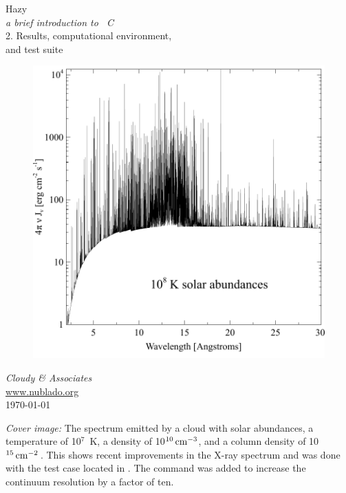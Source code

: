 \documentclass[12pt]{book}
\begin{document}
\frontmatter

\begin{titlepage}
\begin{center}

\Huge
Hazy\\
\Large
\emph{a brief introduction to \Cloudy\ C\VERSION}\\
\LARGE
2. Results, computational environment,\\
and test suite

\begin{figure}
\begin{center}
\includegraphics[clip=on,width=0.8\columnwidth,keepaspectratio]{coll_t7}
\end{center}
\end{figure}

\vspace{15 mm }
\LARGE
\emph{Cloudy \& Associates} \\
\Large
\href{http://www.nublado.org}{www.nublado.org} \\
\normalsize
\today
\end{center}
\end{titlepage}

\clearpage

\vspace{5mm}
\noindent
{\small
{\em Cover image:} The spectrum emitted by a cloud with solar abundances,
a temperature of 10$^7$~K, a density of 10$^{10} {\rm\thinspace cm^{-3}}$, and a column density
of 10$^{15} \mbox{${\rm\thinspace cm}^{-2}\,$}$.  This shows recent improvements in the X-ray spectrum
and was done with the test case  located in
.  The command
 was added to
increase the continuum resolution by a factor of ten.
}
\clearpage
\end{document}
